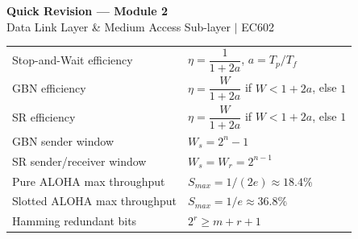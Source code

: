 \documentclass[12pt,a4paper]{article}
\begin{document}
\newpage
\begin{center}
  {\large\bfseries\color{myred} Quick Revision --- Module 2}\\[3pt]
  {\small\color{mydark} Data Link Layer \& Medium Access Sub-layer $|$ EC602}
\end{center}
\noindent{\color{myred}\rule{\linewidth}{1.2pt}}
\vspace{4pt}

\begin{tcolorbox}[formulabox, title={\textbf{Key Formulas at a Glance}}]
\begin{tabularx}{\linewidth}{B{5.0cm} X}
Stop-and-Wait efficiency    & $\eta = \dfrac{1}{1+2a}$, \quad $a = T_p / T_f$ \\[4pt]
GBN efficiency              & $\eta = \dfrac{W}{1+2a}$ if $W < 1+2a$, else $1$ \\[4pt]
SR efficiency               & $\eta = \dfrac{W}{1+2a}$ if $W < 1+2a$, else $1$ \\[4pt]
GBN sender window           & $W_s = 2^n - 1$ \\[2pt]
SR sender/receiver window   & $W_s = W_r = 2^{n-1}$ \\[2pt]
Pure ALOHA max throughput   & $S_{max} = 1/(2e) \approx 18.4\%$ \\[2pt]
Slotted ALOHA max throughput& $S_{max} = 1/e \approx 36.8\%$ \\[2pt]
Hamming redundant bits      & $2^r \geq m + r + 1$ \\[2pt]
\end{tabularx}
\end{tcolorbox}

\vspace{6pt}
\end{document}
